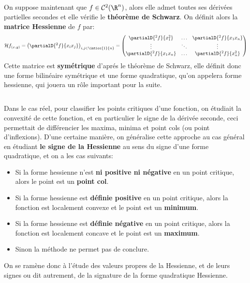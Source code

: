 \subsection*{}
On suppose maintenant que \(f \in \mathcal{C}^2(\R^n)\), alors elle admet toutes ses dérivées partielles secondes et elle vérifie le \textbf{théorème de Schwarz}. On définit alors la \textbf{matrice Hessienne} de \(f\) par:
\[
   \mathcal{H}f_{(x, y)} = \left(\partialD{{}^2f}{x_ix_j}\right)_{i ,j \in \inticc{1}{n}} = 
   \begin{pmatrix}
      \partialD{{}^2f}{x_1^2} & \ldots & \partialD{{}^2f}{x_1x_{n}}\\ 
      \vdots & \ddots & \vdots\\ 
      \partialD{{}^2f}{x_{1}x_n} & \ldots & \partialD{{}^2f}{x_{n}^2}\\   
   \end{pmatrix}   
\]
Cette matrice est \textbf{symétrique} d'aprés le théorème de Schwarz, elle définit donc une forme bilinéaire symétrique et une forme quadratique, qu'on appelera forme hessienne, qui jouera un rôle important pour la suite.
\subsection*{}
Dans le cas réel, pour classifier les points critiques d'une fonction, on étudiait la convexité de cette fonction, et en particulier le signe de la dérivée seconde, ceci permettait de différencier les maxima, minima et point cols (ou point d'inflexions). D'une certaine manière, on généralise cette approche au cas général en étudiant \textbf{le signe de la Hessienne} au sens du signe d'une forme quadratique, et on a les cas suivants:
\begin{itemize}
   \item Si la forme hessienne n'est \textbf{ni positive ni négative} en un point critique, alors le point est un \textbf{point col}.

   \item Si la forme hessienne est \textbf{définie positive} en un point critique, alors la fonction est localement convexe et le point est un \textbf{minimum}.
   \item Si la forme hessienne est \textbf{définie négative} en un point critique, alors la fonction est localement concave et le point est un \textbf{maximum}.
   \item Sinon la méthode ne permet pas de conclure.
\end{itemize}
On se ramène donc à l'étude des valeurs propres de la Hessienne, et de leurs signes ou dit autrement, de la signature de la forme quadratique Hessienne.

